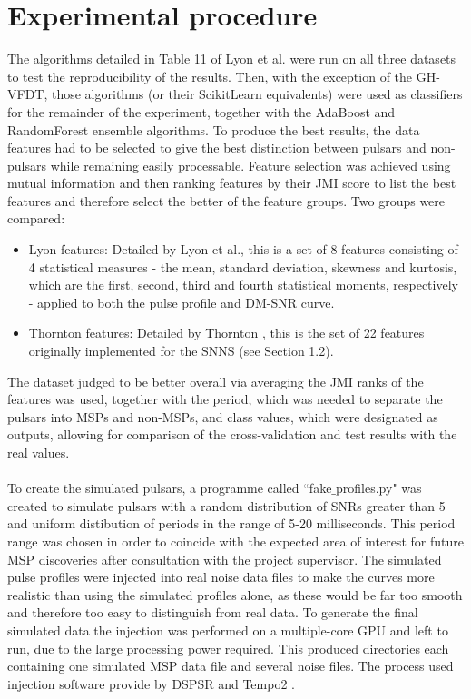 \documentclass[12pt]{article}
\begin{document}
\section{Experimental procedure}

The algorithms detailed in Table 11 of Lyon et al. \cite{lyon2016fifty} were run on all three datasets to test the reproducibility of the results. Then, with the exception of the GH-VFDT, those algorithms (or their ScikitLearn equivalents) were used as classifiers for the remainder of the experiment, together with the AdaBoost and RandomForest ensemble algorithms. To produce the best results, the data features had to be selected to give the best distinction between pulsars and non-pulsars while remaining easily processable. Feature selection was achieved using mutual information and then ranking features by their JMI score to list the best features and therefore select the better of the feature groups. Two groups were compared:

\begin{itemize}
\item Lyon features: Detailed by Lyon et al.\cite{lyon2016fifty}, this is a set of 8 features consisting of 4 statistical measures - the mean, standard deviation, skewness and kurtosis, which are the first, second, third and fourth statistical moments, respectively - applied to both the pulse profile and DM-SNR curve.
\item Thornton features: Detailed by Thornton \cite{thornton2013high}, this is the set of 22 features originally implemented for the SNNS (see Section 1.2).
\end{itemize}

The dataset judged to be better overall via averaging the JMI ranks of the features was used, together with the period, which was needed to separate the pulsars into MSPs and non-MSPs, and class values, which were designated as outputs, allowing for comparison of the cross-validation and test results with the real values.
\paragraph{}
To create the simulated pulsars, a programme called ``fake$\_$profiles.py" was created to simulate pulsars with a random distribution of SNRs greater than 5 and uniform distibution of periods in the range of 5-20 milliseconds. This period range was chosen in order to coincide with the expected area of interest for future MSP discoveries after consultation with the project supervisor. The simulated pulse profiles were injected into real noise data files to make the curves more realistic than using the simulated profiles alone, as these would be far too smooth and therefore too easy to distinguish from real data. To generate the final simulated data the injection was performed on a multiple-core GPU and left to run, due to the large processing power required. This produced directories each containing one simulated MSP data file and several noise files. The process used injection software provide by DSPSR \cite{van2011dspsr} and Tempo2 \cite{hobbs2006tempo2}.
\end{document}

